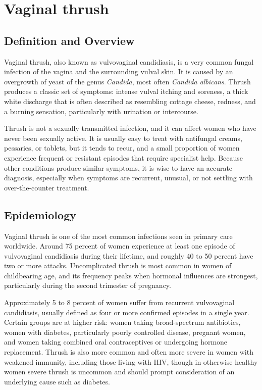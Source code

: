 \chapter{Vaginal thrush}

\section*{Definition and Overview}
Vaginal thrush, also known as vulvovaginal candidiasis, is a very common fungal infection of the vagina and the surrounding vulval skin. It is caused by an overgrowth of yeast of the genus \textit{Candida}, most often \textit{Candida albicans}. Thrush produces a classic set of symptoms: intense vulval itching and soreness, a thick white discharge that is often described as resembling cottage cheese, redness, and a burning sensation, particularly with urination or intercourse.

Thrush is not a sexually transmitted infection, and it can affect women who have never been sexually active. It is usually easy to treat with antifungal creams, pessaries, or tablets, but it tends to recur, and a small proportion of women experience frequent or resistant episodes that require specialist help. Because other conditions produce similar symptoms, it is wise to have an accurate diagnosis, especially when symptoms are recurrent, unusual, or not settling with over-the-counter treatment.

\section*{Epidemiology}
Vaginal thrush is one of the most common infections seen in primary care worldwide. Around 75 percent of women experience at least one episode of vulvovaginal candidiasis during their lifetime, and roughly 40 to 50 percent have two or more attacks. Uncomplicated thrush is most common in women of childbearing age, and its frequency peaks when hormonal influences are strongest, particularly during the second trimester of pregnancy.

Approximately 5 to 8 percent of women suffer from recurrent vulvovaginal candidiasis, usually defined as four or more confirmed episodes in a single year. Certain groups are at higher risk: women taking broad-spectrum antibiotics, women with diabetes, particularly poorly controlled disease, pregnant women, and women taking combined oral contraceptives or undergoing hormone replacement. Thrush is also more common and often more severe in women with weakened immunity, including those living with HIV, though in otherwise healthy women severe thrush is uncommon and should prompt consideration of an underlying cause such as diabetes.

